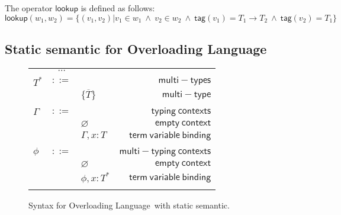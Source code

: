 \documentclass[preprint,authoryear,sort&compress,9pt,nocopyrightspace]{article}
\newcommand{\lab}{\mathsf{tag}}
\newcommand{\buscar}{\mathsf{lookup}}
\newcommand{\semanticD}{Overloading Language}
\newcommand{\mtP}[1]{#1^{*}}
\newcommand{\mtC}[1]{\{\overline {#1}\}}
\newcommand{\emt}{\phi}
\begin{document}
\begin{definition}[$\buscar$]
\label{definition:tcs}
\mbox{}
The operator $\buscar$ is defined  as follows:
\[ \buscar(w_1, w_2) =  
  \{(v_1, v_2) | v_1 \in w_1 \ \wedge \ v_2 \in w_2 \ \wedge \ \lab(v_1) = T_1 \to T_2 \ \wedge \ \lab(v_2) = T_1\}
\]
\end{definition}



\subsection{Static semantic for \semanticD}



\begin{figure}
\begin{small}
\begin{center}
\begin{tabular}{|l c l r|}
\hline
&$\cdots$&&\\
$\mtP{T}$&$::=$&&$\mathsf {multi-types}$\\
&&$\mtC{T}$&$\mathsf {multi-type}$\\
&&&\\
$\Gamma$&$::=$&&$\mathsf {typing \ contexts}$\\
&&$\varnothing$&$\mathsf {empty \ context}$\\
&&$\Gamma , x:T$&$\mathsf {term \ variable \ binding}$\\
&&&\\
$\emt$&$::=$&&$\mathsf {multi-typing \ contexts}$\\
&&$\varnothing$&$\mathsf {empty \ context}$\\
&&$\emt,x: \mtP{T}$&$\mathsf {term \ variable \ binding}$\\
&&&\\
\hline
\end{tabular}
\caption{Syntax for \semanticD \ with static semantic. }
\label{tabla:syntaxstatic}
\end{center}
\end{small}
\end{figure}
\end{document}
